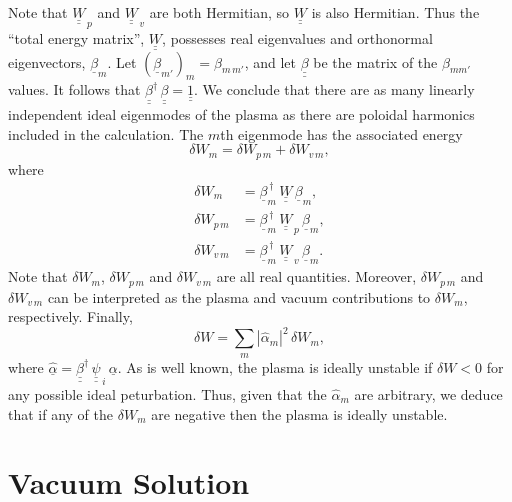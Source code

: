 \documentclass[12pt,prb,aps]{revtex4-1}
\begin{document}
Note that $\underline{\underline{W}}_{\,p}$ and $\underline{\underline{W}}_{\,v}$ are both Hermitian, so $\underline{\underline{W}}$ is also
Hermitian. Thus the ``total energy matrix'', $\underline{\underline{W}}$, possesses real eigenvalues and orthonormal eigenvectors, $\underline{\beta}_m$. Let $(\underline{\beta}_{m'})_{m} = \beta_{m\,m'}$, and let $\underline{\underline{\beta}}$ be the matrix of the $\beta_{mm'}$ values. It follows that  
$\underline{\underline{\beta}}^\dag\,\underline{\underline{\beta}}= \underline{\underline{1}}$. 
We conclude that there are as many linearly independent ideal eigenmodes of the plasma as there are poloidal harmonics included in the calculation. The $m$th
eigenmode has the associated energy
\begin{equation}
\delta W_m = \delta W_{p\,m} + \delta W_{v\,m},
\end{equation}
where 
\begin{align}
\delta W_m &= \underline{\beta}_m^{\,\dag}\,\underline{\underline{W}}\, \underline{\beta}_m,\\[0.5ex]
\delta W_{p\,m} &= \underline{\beta}_m^{\,\dag}\,\underline{\underline{W}}_{\,p}\, \underline{\beta}_m,\\[0.5ex]
\delta W_{v\,m} &= \underline{\beta}_m^{\,\dag}\,\underline{\underline{W}}_{\,v}\, \underline{\beta}_m.
\end{align}
Note that $\delta W_m$, $\delta W_{p\,m}$ and $\delta W_{v\,m}$ are all real quantities. Moreover, $\delta W_{p\,m}$ and $\delta W_{v\,m}$ can be interpreted as the
plasma and vacuum contributions to $\delta W_m$, respectively. Finally, 
\begin{equation}
\delta W = \sum_m |\hat{\alpha}_m|^2\,\delta W_m,
\end{equation}
where $\underline{\hat{\alpha}}= \underline{\underline{\beta}}^\dag\,\underline{\underline{\psi}}_{\,i}\,\underline{\alpha}$. 
As is well known, the plasma is ideally unstable if $\delta W<0$ for any possible ideal peturbation.\cite{freidberg,ideal}
Thus, given that the $\hat{\alpha}_m$ are arbitrary, we deduce that if any of the $\delta W_m$ are negative then the plasma is ideally unstable.

\section{Vacuum Solution}\label{vacuum}
\end{document}
